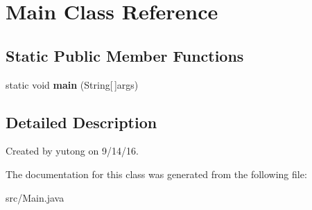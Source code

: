 \hypertarget{classMain}{\section{Main Class Reference}
\label{classMain}
}
\subsection*{Static Public Member Functions}
\begin{DoxyCompactItemize}
\item 
\hypertarget{classMain_ac4044c12d5a6392e6cbe6b60dd70d894}{static void {\bfseries main} (String\mbox{[}$\,$\mbox{]}args)}\label{classMain_ac4044c12d5a6392e6cbe6b60dd70d894}

\end{DoxyCompactItemize}


\subsection{Detailed Description}
Created by yutong on 9/14/16. 

The documentation for this class was generated from the following file\-:\begin{DoxyCompactItemize}
\item 
src/Main.\-java\end{DoxyCompactItemize}
